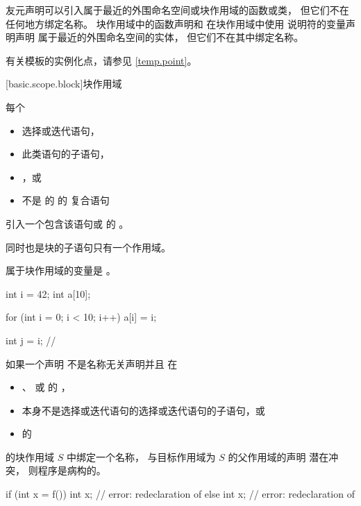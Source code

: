 \pnum
\begin{note}
友元声明可以引入属于最近的外围命名空间或块作用域的函数或类，
但它们不在任何地方绑定名称。
块作用域中的函数声明和
在块作用域中使用  说明符的变量声明声明
属于最近的外围命名空间的实体，
但它们不在其中绑定名称。
\end{note}

\pnum
\begin{note}
有关模板的实例化点，请参见 \ref{temp.point}。
\end{note}

[basic.scope.block]{块作用域}

%

\pnum
每个
\begin{itemize}
\item
选择或迭代语句，
\item
此类语句的子语句，
\item
{}%
，或
\item
不是  的  的
复合语句
\end{itemize}
引入一个包含该语句或  的 。
\begin{note}
同时也是块的子语句只有一个作用域。
\end{note}
属于块作用域的变量是 。
\begin{example}
\begin{codeblock}
int i = 42;
int a[10];

for (int i = 0; i < 10; i++)
  a[i] = i;

int j = i;          // 
\end{codeblock}
\end{example}

\pnum
如果一个声明
不是名称无关声明并且
在
\begin{itemize}
\item
{}、 或  的 ，
\item
本身不是选择或迭代语句的选择或迭代语句的子语句，或
\item
{} 的 
\end{itemize}
的块作用域 $S$ 中绑定一个名称，
与目标作用域为 $S$ 的父作用域的声明
潜在冲突，
则程序是病构的。
\begin{example}
\begin{codeblock}
if (int x = f()) {
  int x;            // error: redeclaration of 
}
else {
  int x;            // error: redeclaration of 
}
\end{codeblock}
\end{example}

